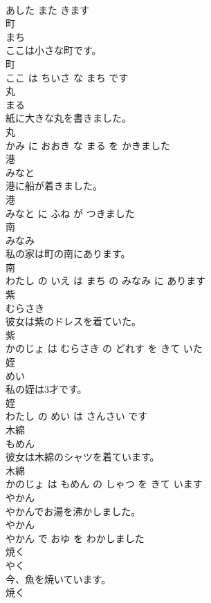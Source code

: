\documentclass[8pt]{extreport}
\begin{document}
\begin{CJK}{UTF8}{min}
\\	あした また きます			
\\	町	
\\	まち			
\\	ここは小さな町です。	
\\	町 
\\	ここ は ちいさ な まち です			
\\	丸	
\\	まる			
\\	紙に大きな丸を書きました。	
\\	丸 
\\	かみ に おおき な まる を かきました			
\\	港	
\\	みなと			
\\	港に船が着きました。	
\\	港 
\\	みなと に ふね が つきました			
\\	南	
\\	みなみ			
\\	私の家は町の南にあります。	
\\	南 
\\	わたし の いえ は まち の みなみ に あります			
\\	紫	
\\	むらさき			
\\	彼女は紫のドレスを着ていた。	
\\	紫 
\\	かのじょ は むらさき の どれす を きて いた			
\\	姪	
\\	めい			
\\	私の姪は3才です。	
\\	姪 
\\	わたし の めい は さんさい です			
\\	木綿	
\\	もめん			
\\	彼女は木綿のシャツを着ています。	
\\	木綿 
\\	かのじょ は もめん の しゃつ を きて います			
\\	やかん	
\\	やかんでお湯を沸かしました。	
\\	やかん 
\\	やかん で おゆ を わかしました			
\\	焼く	
\\	やく			
\\	今、魚を焼いています。	
\\	焼く 

\end{CJK}
\end{document}

